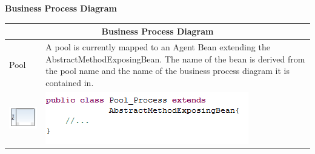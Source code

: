 \textbf{\large{Business Process Diagram}}\\
		\begin{tabularx}{\linewidth}{|l|X|}\hline\hline
			\multicolumn{2}{|c|}{\textbf{Business Process Diagram}} \\\hline\hline
			 Pool & A pool is currently mapped to an Agent Bean extending the AbstractMethodExposingBean. The name of the bean is derived from the pool name and the name of the business process diagram it is contained in.\\
			 \includegraphics{images/mapping/pool.png}  & \includegraphics{images/mapping/poolcode.png}\\\hline
			 \end{tabularx}\\\\
			 
